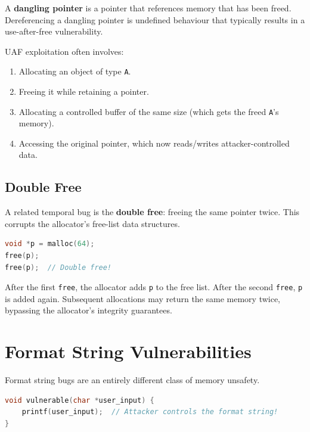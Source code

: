 \begin{definition}
	A \textbf{dangling pointer} is a pointer that references memory that has been freed. Dereferencing a dangling pointer is undefined behaviour that typically results in a use-after-free vulnerability.
\end{definition}

UAF exploitation often involves:

\begin{enumerate}
	\item Allocating an object of type \texttt{A}.
	\item Freeing it while retaining a pointer.
	\item Allocating a controlled buffer of the same size (which gets the freed \texttt{A}'s memory).
	\item Accessing the original pointer, which now reads/writes attacker-controlled data.
\end{enumerate}

\subsection{Double Free}

A related temporal bug is the \textbf{double free}: freeing the same pointer twice. This corrupts the allocator's free-list data structures.

\begin{lstlisting}[language=C, caption=Double free]
void *p = malloc(64);
free(p);
free(p);  // Double free!
\end{lstlisting}

After the first \texttt{free}, the allocator adds \texttt{p} to the free list. After the second \texttt{free}, \texttt{p} is added again. Subsequent allocations may return the same memory twice, bypassing the allocator's integrity guarantees.

\section{Format String Vulnerabilities}

Format string bugs are an entirely different class of memory unsafety.

\begin{lstlisting}[language=C, caption=Format string vulnerability]
void vulnerable(char *user_input) {
    printf(user_input);  // Attacker controls the format string!
}
\end{lstlisting}

